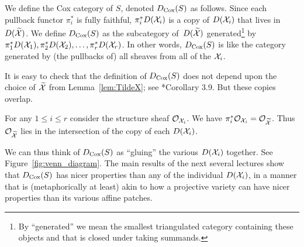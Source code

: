 \documentclass{amsart}
\begin{document}
\begin{defn}\label{defn:CoxCategory}
We define the Cox category of $S$, denoted $D_{\operatorname{Cox}}(S)$ as follows.  Since each pullback functor $\pi_i^*$ is fully faithful, $\pi_i^* D(\mathcal X_i)$ is a copy of $D(\mathcal X_i)$ that lives in $D(\widetilde{\mathcal X})$.
We define $D_{\operatorname{Cox}}(S)$ as the subcategory of~$D(\widetilde{\mathcal X})$ generated\footnote{By ``generated'' we mean the smallest triangulated category containing these objects and that is closed under taking summands.} by $\pi_1^*D(\mathcal X_1), \pi_2^* D(\mathcal X_2), \dots, \pi_r^* D(\mathcal X_r)$. In other words, $D_{\operatorname{Cox}}(S)$ is like the category generated by (the pullbacks of) all sheaves from all of the $\mathcal X_i$.
\end{defn}
It is easy to check that the definition of $D_{\operatorname{Cox}}(S)$
does not depend upon the choice of $\widetilde{\mathcal X}$ from Lemma~\ref{lem:TildeX}; see \cite{BBB+24}*{Corollary 3.9}. But these copies overlap.
\begin{example}
   For any $1\leq i \leq r$ consider the structure sheaf ${\mathcal O}_{\mathcal X_i}$.  We have $\pi_i^*{\mathcal O}_{\mathcal X_i} = {\mathcal O}_{\widetilde{\mathcal X}}$.  Thus ${\mathcal O}_{\widetilde{\mathcal X}}$ lies in the intersection of the copy of each $D(\mathcal X_i)$.
\end{example}


We can thus think of $D_{\operatorname{Cox}}(S)$ as ``gluing'' the various $D(\mathcal X_i)$ together.  See Figure~\ref{fig:venn_diagram}.  The main results of the next several lectures show that $D_{\operatorname{Cox}}(S)$ has nicer properties than any of the individual $D(\mathcal X_i)$, in a manner that is (metaphorically at least) akin to how a projective variety can have nicer properties than its various affine patches.
\end{document}
